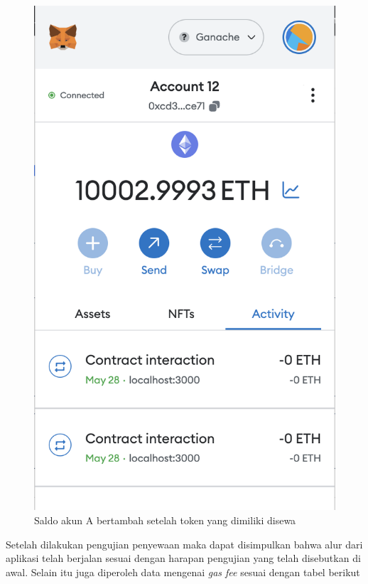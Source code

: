\begin{itemize}
\begin{figure} [H]
        \includegraphics[scale=0.4]{gambar/img-test-rent-rent-6.png}
        \caption{Saldo akun A bertambah setelah token yang dimiliki disewa}
        \label{fig:TestRentResultRental4}
      \end{figure}
    \end{itemize}
  
  Setelah dilakukan pengujian penyewaan maka dapat disimpulkan bahwa alur dari aplikasi telah berjalan sesuai dengan harapan pengujian yang telah disebutkan di awal. Selain itu juga diperoleh data mengenai \emph{gas fee} sesuai dengan tabel berikut
  
